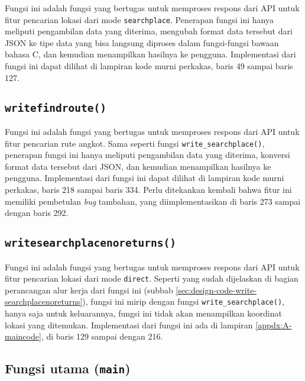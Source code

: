 Fungsi ini adalah fungsi yang bertugas untuk memproses respons dari API untuk fitur pencarian lokasi dari mode \verb|searchplace|. Penerapan fungsi ini hanya meliputi pengambilan data yang diterima, mengubah format data tersebut dari JSON ke tipe data yang bisa langsung diproses dalam fungsi-fungsi bawaan bahasa C, dan kemudian menampilkan hasilnya ke pengguna. Implementasi dari fungsi ini dapat dilihat di lampiran kode murni perkakas, baris 49 sampai baris 127.
	
\subsection{\texttt{write\textunderscore findroute()}}
\label{sec:testing-implementation-write-findroute}

Fungsi ini adalah fungsi yang bertugas untuk memproses respons dari API untuk fitur pencarian rute angkot. Sama seperti fungsi \verb|write_searchplace()|, penerapan fungsi ini hanya meliputi pengambilan data yang diterima, konversi format data tersebut dari JSON, dan kemudian menampilkan hasilnya ke pengguna. Implementasi dari fungsi ini dapat dilihat di lampiran kode murni perkakas, baris 218 sampai baris 334. Perlu ditekankan kembali bahwa fitur ini memiliki pembetulan \textit{bug} tambahan, yang diimplementasikan di baris 273 sampai dengan baris 292.

\subsection{\texttt{write\textunderscore searchplace\textunderscore noreturns()}}
\label{sec:testing-implementation-write-searchplacenoreturns}

Fungsi ini adalah fungsi yang bertugas untuk memproses respons dari API untuk fitur pencarian lokasi dari mode \verb|direct|. Seperti yang sudah dijelaskan di bagian perancangan alur kerja dari fungsi ini (subbab \ref{sec:design-code-write-searchplacenoreturns}), fungsi ini mirip dengan fungsi \verb|write_searchplace()|, hanya saja untuk keluarannya, fungsi ini tidak akan menampilkan koordinat lokasi yang ditemukan. Implementasi dari  fungsi ini ada di lampiran \ref{appdx:A-maincode}, di baris 129 sampai dengan 216.

\subsection{Fungsi utama (\texttt{main})}
\label{sec:testing-implementation-main}


